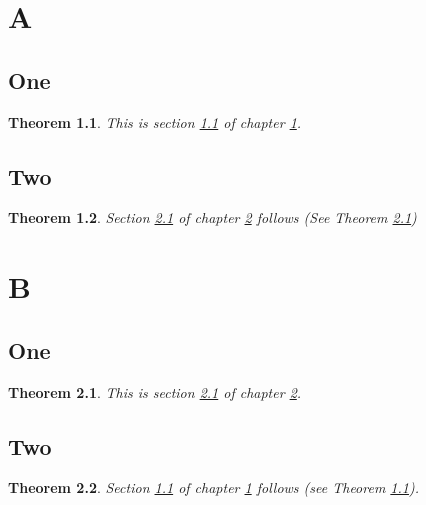 \documentclass{book}
\newtheorem{theorem}{Theorem}[chapter]
\begin{document}
\chapter{A}

\label{A}

\section{One}
\label{Aone}

\begin{theorem}
\label{A1}
This is section \ref{Aone} of chapter \ref {A}. 
\end{theorem}

\section{Two}
\label{Atwo}

\begin{theorem}
\label{A2}
Section \ref{Bone} of chapter \ref {B} follows
(See Theorem \ref{B1})
\end{theorem}


\chapter{B}
\label{B}

\section{One}
\label{Bone}
\begin{theorem}
\label{B1}
This is section \ref{Bone} of chapter \ref {B}. 
\end{theorem}

\section{Two}
\label{Btwo}

\begin{theorem}
\label{B2}
Section \ref{Aone} of chapter \ref {A} follows (see Theorem \ref{A1}).
\end{theorem}
\end{document}
